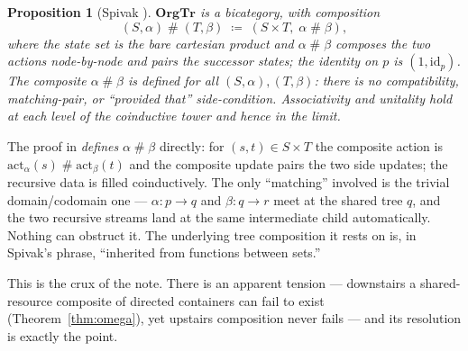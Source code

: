 \documentclass[11pt]{amsart}
\newtheorem{proposition}[theorem]{Proposition}
\theoremstyle{definition}
\theoremstyle{remark}
\newcommand{\OrgTr}{\mathbf{OrgTr}}
\newcommand{\id}{\mathrm{id}}
\begin{document}
\begin{proposition}[Spivak {\cite[Prop.~4.3]{SpivakOrgTr}}]\label{prop:total}
$\OrgTr$ is a bicategory, with composition
\[
  (S,\alpha)\mathbin{\#}(T,\beta)\;\coloneqq\;(S\times T,\;\alpha\mathbin{\#}\beta),
\]
where the state set is the bare cartesian product and $\alpha\mathbin{\#}\beta$ composes
the two actions node-by-node and pairs the successor states; the identity on $p$ is
$(1,\id_p)$. The composite $\alpha\mathbin{\#}\beta$ is defined for all
$(S,\alpha),(T,\beta)$: there is no compatibility, matching-pair, or ``provided that''
side-condition. Associativity and unitality hold at each level of the coinductive tower and
hence in the limit.
\end{proposition}

The proof in \cite{SpivakOrgTr} \emph{defines} $\alpha\mathbin{\#}\beta$ directly: for
$(s,t)\in S\times T$ the composite action is $\mathrm{act}_\alpha(s)\mathbin{\#}
\mathrm{act}_\beta(t)$ and the composite update pairs the two side updates; the recursive
data is filled coinductively. The only ``matching'' involved is the trivial domain/codomain
one --- $\alpha\colon p\to q$ and $\beta\colon q\to r$ meet at the shared tree $q$, and the
two recursive streams land at the same intermediate child automatically. Nothing can
obstruct it. The underlying tree composition it rests on is, in Spivak's phrase, ``inherited
from functions between sets.''

This is the crux of the note. There is an apparent tension --- downstairs a shared-resource
composite of directed containers can fail to exist (Theorem~\ref{thm:omega}), yet upstairs
composition never fails --- and its resolution is exactly the point.
\end{document}

